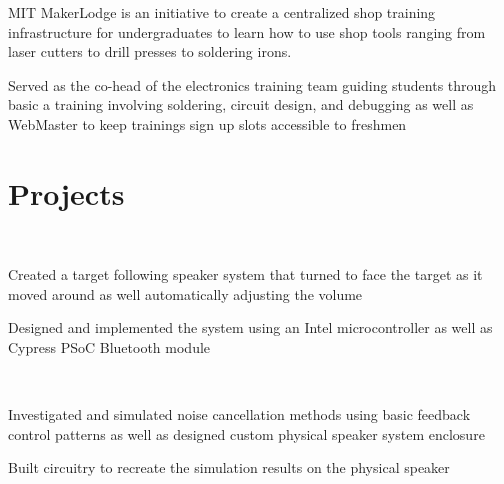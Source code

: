 \documentclass[letterpaper, article]{deedy-resume-openfont}
\begin{document}
\begin{minipage}[t]{0.66\textwidth}

\begin{tightemize}
	\item MIT MakerLodge is an initiative to create a centralized shop training infrastructure for undergraduates to learn how to use shop tools ranging from laser cutters to drill presses to soldering irons.
	\item Served as the co-head of the electronics training team guiding students through basic a training involving soldering, circuit design, and debugging as well as WebMaster to keep trainings sign up slots accessible to freshmen
\end{tightemize}


\section{Projects}

\\
\begin{tightemize}
	\item Created a target following speaker system that turned to face the target as it moved around as well automatically adjusting the volume
	\item Designed and implemented the system using an Intel microcontroller as well as Cypress PSoC Bluetooth module
\end{tightemize}

\\
\begin{tightemize}
	\item Investigated and simulated noise cancellation methods using basic feedback control patterns as well as designed custom physical speaker system enclosure
	\item Built circuitry to recreate the simulation results on the physical speaker
\end{tightemize}


\end{minipage}
\end{document}
